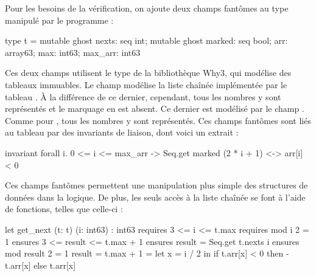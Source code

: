 \documentclass[a4paper]{easychair}
\begin{document}


Pour les besoins de la vérification, on ajoute deux champs fantômes
au type  manipulé par le programme :
\begin{why3}
type t = {
  mutable ghost nexts: seq int;
  mutable ghost marked: seq bool;
  arr: array63;
  max: int63;
  max_arr: int63
}
\end{why3}
Ces deux champs utilisent le type  de la bibliothèque Why3,
qui modélise des tableaux immuables.
Le champ  modélise la liste chaînée implémentée par le
tableau . À la différence de ce dernier, cependant, tous les
nombres y sont représentés et le marquage en est absent.
Ce dernier est modélisé par le champ . Comme pour , tous les
nombres y sont représentés.
Ces champs fantômes sont liés au tableau  par des invariants de
liaison, dont voici un extrait :
\begin{why3}
invariant { forall i. 0 <= i <= max_arr ->
                 Seq.get marked (2 * i + 1) <-> arr[i] < 0 }
\end{why3}
Ces champs fantômes permettent une manipulation plus simple des
structures de données dans la logique. De plus, les seuls accès à la liste
chaînée se font à l'aide de fonctions, telles que
celle-ci :
\begin{why3}
let get_next (t: t) (i: int63) : int63
  requires { 3 <= i <= t.max }
  requires { mod i 2 = 1 }
  ensures  { 3 <= result <= t.max + 1 }
  ensures  { result = Seq.get t.nexts i }
  ensures  { mod result 2 = 1 \/ result = t.max + 1 }
= let x = i / 2 in
  if t.arr[x] < 0 then - t.arr[x] else t.arr[x]
\end{why3}
\end{document}
